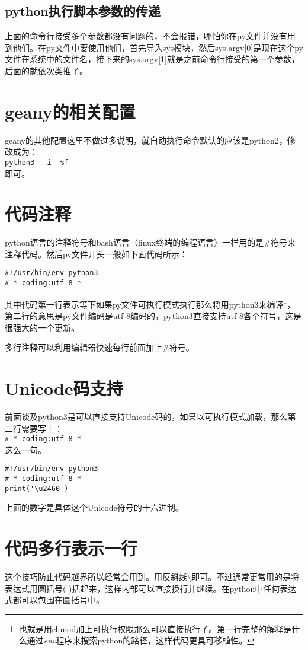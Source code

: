\documentclass[12pt,oneside]{book}
\begin{document}
\begin{common-format}
\subsection{python执行脚本参数的传递}
上面的命令行接受多个参数都没有问题的，不会报错，哪怕你在py文件并没有用到他们。在py文件中要使用他们，首先导入sys模块，然后sys.argv[0]是现在这个py文件在系统中的文件名，接下来的sys.argv[1]就是之前命令行接受的第一个参数，后面的就依次类推了。


\section{geany的相关配置}
geany的其他配置这里不做过多说明，就自动执行命令默认的应该是python2，修改成为：\\
\verb+python3  -i  %f  +\\
即可。


\section{代码注释}
python语言的注释符号和bash语言（linux终端的编程语言）一样用的是\#{}符号来注释代码。然后py文件开头一般如下面代码所示：
\begin{Verbatim}
#!/usr/bin/env python3
#-*-coding:utf-8-*-
\end{Verbatim}
其中代码第一行表示等下如果py文件可执行模式执行那么将用python3来编译\footnote{也就是用chmod加上可执行权限那么可以直接执行了。第一行完整的解释是什么通过\textit{env}程序来搜索python的路径，这样代码更具可移植性。}，第二行的意思是py文件编码是utf-8编码的，python3直接支持utf-8各个符号，这是很强大的一个更新。


多行注释可以利用编辑器快速每行前面加上\#{}符号。

\section{Unicode码支持}
前面谈及python3是可以直接支持Unicode码的，如果以可执行模式加载，那么第二行需要写上：\\
\verb+#-*-coding:utf-8-*-+\\
这么一句。

\begin{Verbatim}
#!/usr/bin/env python3
#-*-coding:utf-8-*-
print('\u2460')
\end{Verbatim}
上面的数字是具体这个Unicode符号的十六进制。

\section{代码多行表示一行}
这个技巧防止代码越界所以经常会用到。用反斜线\textbackslash 即可。不过通常更常用的是将表达式用圆括号( )括起来，这样内部可以直接换行并继续。在python中任何表达式都可以包围在圆括号中。


\end{common-format}
\end{document}
